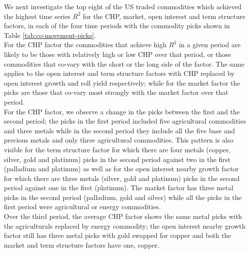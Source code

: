 \documentclass[]{elsarticle} %
\begin{document}
\medskip\setlength{\parindent}{0pt}

We next investigate the top eight of the US traded commodities which achieved the highest time series \(R^{2}\) for the CHP, market, open interest and term structure factors, in each of the four time periods with the commodity picks shown in Table \ref{tab:co-movement-picks}.\\
For the CHP factor the commodities that achieve high \(R^{2}\) in a given period are likely to be those with relatively high or low CHP over that period, or those commodities that co-vary with the short or the long side of the factor. The same applies to the open interest and term structure factors with CHP replaced by open interest growth and roll yield respectively; while for the market factor the picks are those that co-vary most strongly with the market factor over that period.\\
For the CHP factor, we observe a change in the picks between the first and the second period; the picks in the first period included five agricultural commodities and three metals while in the second period they include all the five base and precious metals and only three agricultural commodities. This pattern is also visible for the term structure factor for which there are four metals (copper, silver, gold and platinum) picks in the second period against two in the first (palladium and platinum) as well as for the open interest nearby growth factor for which there are three metals (silver, gold and platinum) picks in the second period against one in the first (platinum). The market factor has three metal picks in the second period (palladium, gold and silver) while all the picks in the first period were agricultural or energy commodities.\\
Over the third period, the average CHP factor shows the same metal picks with the agriculturals replaced by energy commodity; the open interest nearby growth factor still has three metal picks with gold swapped for copper and both the market and term structure factors have one, copper.\\
\end{document}
